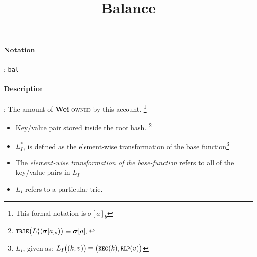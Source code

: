 \documentclass[10pt,a4paper,oneside]{scrartcl}
\author{}
\title{Balance}
\date{}
\begin{document}
\maketitle
\paragraph{Notation}: \texttt{bal}
\paragraph{Description}: The amount of \textbf{Wei} \textsc{owned} by this account. \footnote{This formal notation is $\sigma[a]_b$}
    \begin{itemize}
        \item Key/value pair stored inside the root hash. \footnote{$\texttt{\small TRIE}\big(L_I^*(\boldsymbol{\sigma}[a]_\mathbf{s})\big) \equiv \boldsymbol{\sigma}[a]_s$}
        \item $L_I^*$, is defined as the element-wise transformation of the base function\footnote{$L_I$, given as: $L_I\big( (k, v) \big) \equiv \big(\texttt{\small KEC}(k
), \texttt{\small RLP}(v)\big)$}
        \item The \textsl{element-wise transformation of the base-function} refers to all of the key/value pairs in \textit{$L_I$}
        \item $L_I$ refers to a particular \gls{trie}.
    \end{itemize}
\end{document}
